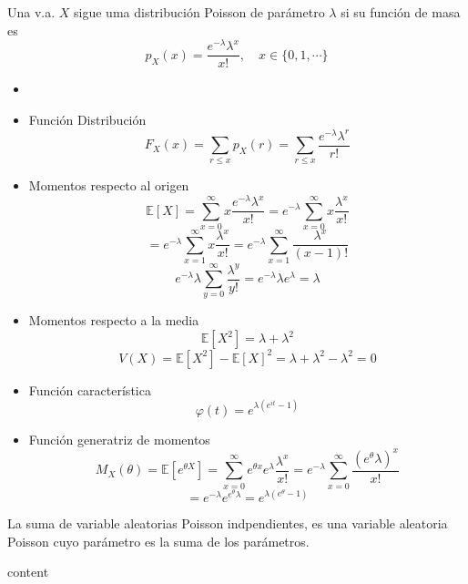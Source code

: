 \begin{defn}
  Una v.a. $X$ sigue uma distribución Poisson de parámetro $\lambda$ si su función de masa es
  \[ 
    p_{X}(x) = \frac{e^{-\lambda} \lambda^{x}}{x !}, \quad x \in \{ 0, 1, \cdots \} 
  \] 
\end{defn}

\begin{prop}
  \begin{itemize}
    \item []
    \item Función Distribución
      \[ 
        F_{X}(x) = \sum_{r \leq x} p_{X}(r) = \sum_{r \leq x} \frac{e^{-\lambda} \lambda^{r}}{r!} 
      \] 
    \item Momentos respecto al origen
      \[ 
        \mathbb{E} [ X ] = \sum_{x = 0}^{\infty} x \frac{e^{-\lambda} \lambda^{x}}{x!} = e^{-\lambda} \sum_{x = 0}^{\infty} x \frac{ \lambda^{x}}{x!}
      \] 
      \[ 
        = e^{-\lambda} \sum_{x = 1}^{\infty} x \frac{\lambda^{x}}{x!} = e^{-\lambda} \sum_{x = 1}^{\infty} \frac{\lambda^{x}}{(x-1)!}
      \] 
      \[ 
        e^{-\lambda} \lambda \sum_{y = 0}^{\infty} \frac{\lambda^{y}}{y!} = e^{- \lambda} \lambda e^{\lambda} = \lambda
      \] 
    \item Momentos respecto a la media
      \[ 
        \mathbb{E} [ X^{2} ] = \lambda + \lambda^{2} 
      \] 
      \[ 
        V(X) = \mathbb{E} [ X^{2} ] - \mathbb{E} [ X ]^{2} = \lambda + \lambda^{2} - \lambda^{2} = 0
      \] 
    \item Función característica
      \[ 
        \varphi(t) = e^{\lambda(e^{i t} - 1)} 
      \] 
    \item Función generatriz de momentos
      \[
        M_{X}(\theta) = \mathbb{E} [ e^{\theta X} ] = \sum_{x = 0}^{\infty} e^{\theta x} e^{\lambda} \frac{\lambda^{x}}{x!} = e^{-\lambda} \sum_{x = 0}^{\infty} \frac{(e^{\theta} \lambda)^{x}}{x!}
      \]
      \[ 
        = e^{-\lambda} e^{e^{\theta} \lambda} = e^{\lambda(e^{\theta} - 1)} 
      \] 
  \end{itemize}
\end{prop}

\begin{theo}
  La suma de variable aleatorias Poisson indpendientes, es una variable aleatoria Poisson cuyo parámetro es la suma de los parámetros.
\end{theo}

\begin{dem}
  content
\end{dem}

